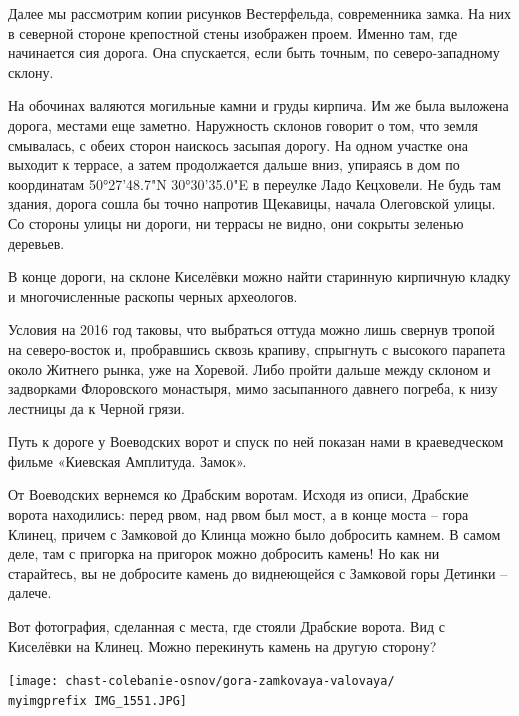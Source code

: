 Далее мы рассмотрим копии рисунков Вестерфельда, современника замка. На них в северной стороне крепостной стены изображен проем. Именно там, где начинается сия дорога. Она спускается, если быть точным, по северо-западному склону.

На обочинах валяются могильные камни и груды кирпича. Им же была выложена дорога, местами еще заметно. Наружность склонов говорит о том, что земля смывалась, с обеих сторон наискось засыпая дорогу. На одном участке она выходит к террасе, а затем продолжается дальше вниз, упираясь в дом по координатам 50°27'48.7"N 30°30'35.0"E в переулке Ладо Кецховели. Не будь там здания, дорога сошла бы точно напротив Щекавицы, начала Олеговской улицы. Со стороны улицы ни дороги, ни террасы не видно, они сокрыты зеленью деревьев.

В конце дороги, на склоне Киселёвки можно найти старинную кирпичную кладку и многочисленные раскопы черных археологов. 

Условия на 2016 год таковы, что выбраться оттуда можно лишь свернув тропой на северо-восток и, пробравшись сквозь крапиву, спрыгнуть с высокого парапета около Житнего рынка, уже на Хоревой. Либо пройти дальше между склоном и задворками Флоровского монастыря, мимо засыпанного давнего погреба, к низу лестницы да к Черной грязи.

Путь к дороге у Воеводских ворот и спуск по ней показан нами в краеведческом фильме «Киевская Амплитуда. Замок».


От Воеводских вернемся ко Драбским воротам. Исходя из описи, Драбские ворота находились: перед рвом, над рвом был мост, а в конце моста – гора Клинец, причем с Замковой до Клинца можно было добросить камнем. В самом деле, там с пригорка на пригорок можно добросить камень! Но как ни старайтесь, вы не добросите камень до виднеющейся с Замковой горы Детинки – далече.

Вот фотография, сделанная с места, где стояли Драбские ворота. Вид с Киселёвки на Клинец. Можно перекинуть камень на другую сторону?

\begin{center}
\texttt{[image: chast-colebanie-osnov/gora-zamkovaya-valovaya/\\myimgprefix IMG\_1551.JPG]}
\end{center}

